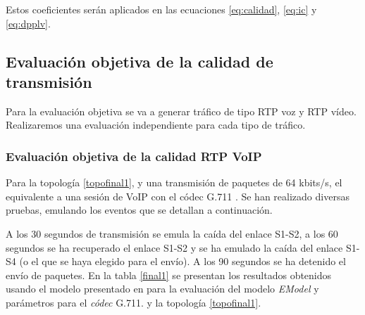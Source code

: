 \documentclass[a4paper,11pt]{book}
\begin{document}
Estos coeficientes serán aplicados en las ecuaciones \ref{eq:calidad}, \ref{eq:ic} y \ref{eq:dpplv}.



\subsection{Evaluación objetiva de la calidad de transmisión}

Para la evaluación objetiva se va a generar tráfico de tipo \ac{RTP} voz y \ac{RTP} vídeo. Realizaremos una evaluación independiente para cada tipo de tráfico.


%
\subsubsection{Evaluación objetiva de la calidad \ac{RTP} \ac{VoIP}}

Para la topología \ref{topofinal1}, y una transmisión de paquetes de 64 kbits/s, el equivalente a una sesión de VoIP con el códec G.711 \cite{ituG711}. Se han realizado diversas pruebas, emulando los eventos que se detallan a continuación.

A los 30 segundos de transmisión se emula la caída del enlace S1-S2, a los 60 segundos se ha recuperado el enlace S1-S2 y se ha emulado la caída del enlace S1-S4 (o el que se haya elegido para el envío). A los 90 segundos se ha detenido el envío de paquetes. En la tabla \ref{final1} se presentan los resultados obtenidos usando el modelo presentado en \cite{ramos2005efficient} para la evaluación del modelo \textit{EModel} y parámetros para el \textit{códec} G.711. y la topología \ref{topofinal1}.
\end{document}
